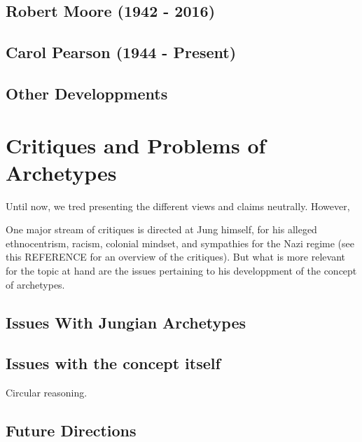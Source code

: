 \documentclass[
]{book}
\begin{document}
\hypertarget{robert-moore-1942---2016}{%
\subsection{Robert Moore (1942 - 2016)}\label{robert-moore-1942---2016}}

\hypertarget{carol-pearson-1944---present}{%
\subsection{Carol Pearson (1944 - Present)}\label{carol-pearson-1944---present}}

\hypertarget{other-developpments}{%
\subsection{Other Developpments}\label{other-developpments}}

\hypertarget{critiques-and-problems-of-archetypes}{%
\section{Critiques and Problems of Archetypes}\label{critiques-and-problems-of-archetypes}}

Until now, we tred presenting the different views and claims neutrally. However,

One major stream of critiques is directed at Jung himself, for his alleged ethnocentrism, racism, colonial mindset, and sympathies for the Nazi regime (see this REFERENCE for an overview of the critiques). But what is more relevant for the topic at hand are the issues pertaining to his developpment of the concept of archetypes.

\hypertarget{issues-with-jungian-archetypes}{%
\subsection{Issues With Jungian Archetypes}\label{issues-with-jungian-archetypes}}

\hypertarget{issues-with-the-concept-itself}{%
\subsection{Issues with the concept itself}\label{issues-with-the-concept-itself}}

Circular reasoning.

\hypertarget{future-directions}{%
\subsection{Future Directions}\label{future-directions}}
\end{document}
